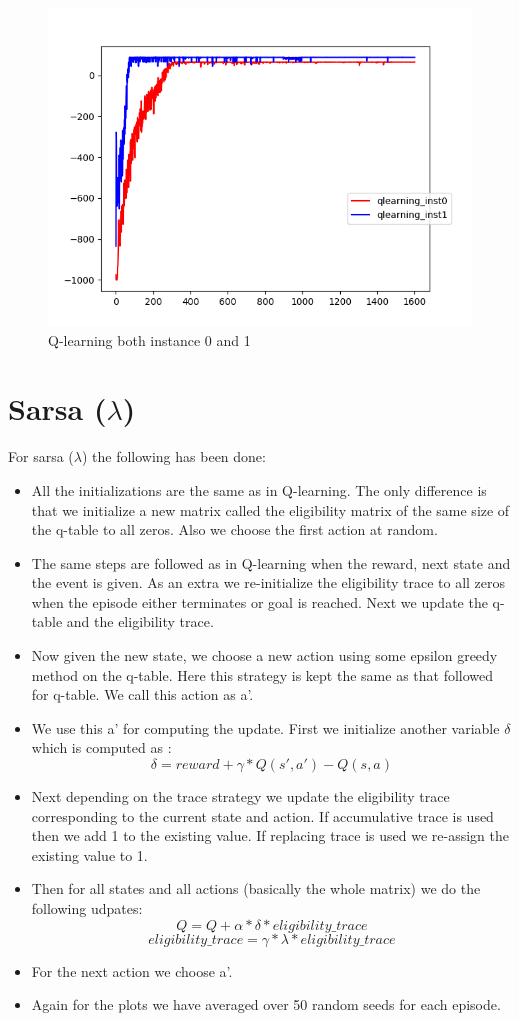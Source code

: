 \documentclass{article}
\begin{document}
\begin{figure}[H]
  \centering
  \includegraphics[scale=0.5]{images/qlearn_instance_0_1}
  \caption{Q-learning both instance 0 and 1}
  \label{fig:ql01}
\end{figure}
\section{Sarsa ($\lambda$)}
For sarsa ($\lambda$) the following has been done:
\begin{itemize}
\item All the initializations are the same as in Q-learning. The only difference is that we initialize a new matrix called the eligibility matrix of the same size of the q-table to all zeros. Also we choose the first action at random.
\item The same steps are followed as in Q-learning when the reward, next state and the event is given. As an extra we re-initialize the eligibility trace to all zeros when the episode either terminates or goal is reached. Next we update the q-table and the eligibility trace.
\item Now given the new state, we choose a new action using some epsilon greedy method on the q-table. Here this strategy is kept the same as that followed for q-table. We call this action as a'.
\item We use this a' for computing the update. First we initialize another variable $\delta$ which is computed as :
  $$\delta = reward + \gamma * Q(s', a') - Q(s, a)$$
\item Next depending on the trace strategy we update the eligibility trace corresponding to the current state and action. If accumulative trace is used then we add 1 to the existing value. If replacing trace is used we re-assign the existing value to 1.
\item Then for all states and all actions (basically the whole matrix) we do the following udpates:
  $$Q = Q + \alpha * \delta * eligibility\_trace$$
  $$eligibility\_trace = \gamma * \lambda * eligibility\_trace$$
\item For the next action we choose a'.
\item Again for the plots we have averaged over 50 random seeds for each episode.
\end{itemize}
\end{document}
